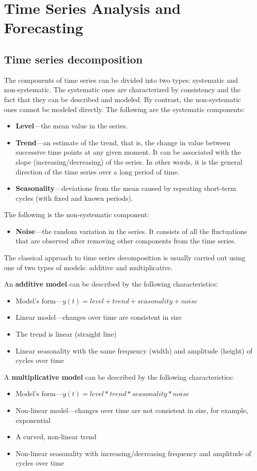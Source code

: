 \chapter{Time Series Analysis and Forecasting\label{ch06}}
\section{Time series decomposition}
The components of time series can be divided into two types: systematic and non-systematic. The
systematic ones are characterized by consistency and the fact that they can be described and modeled.
By contrast, the non-systematic ones cannot be modeled directly.
The following are the systematic components:
\begin{itemize}
    \item \textbf{Level}—the mean value in the series.
    \item \textbf{Trend}—an estimate of the trend, that is, the change in value between successive time points at any given moment. It can be associated with the slope (increasing/decreasing) of the series. In other words, it is the general direction of the time series over a long period of time.
    \item \textbf{Seasonality}—deviations from the mean caused by repeating short-term cycles (with fixed and
          known periods).
\end{itemize}
The following is the non-systematic component:
\begin{itemize}
    \item \textbf{Noise}—the random variation in the series. It consists of all the fluctuations that are observed after removing other components from the time series.
\end{itemize}
The classical approach to time series decomposition is usually carried out using one of two types of models: additive and multiplicative.

An \textbf{additive model} can be described by the following characteristics:
\begin{itemize}
    \item Model's form—$y(t) = level + trend + seasonality + noise$
    \item Linear model—changes over time are consistent in size
    \item The trend is linear (straight line)
    \item Linear seasonality with the same frequency (width) and amplitude (height) of cycles over time
\end{itemize}

A \textbf{multiplicative model} can be described by the following characteristics:
\begin{itemize}
    \item Model's form—$y(t) = level * trend * seasonality * noise$
    \item Non-linear model—changes over time are not consistent in size, for example, exponential
    \item A curved, non-linear trend
    \item Non-linear seasonality with increasing/decreasing frequency and amplitude of cycles over time
\end{itemize}